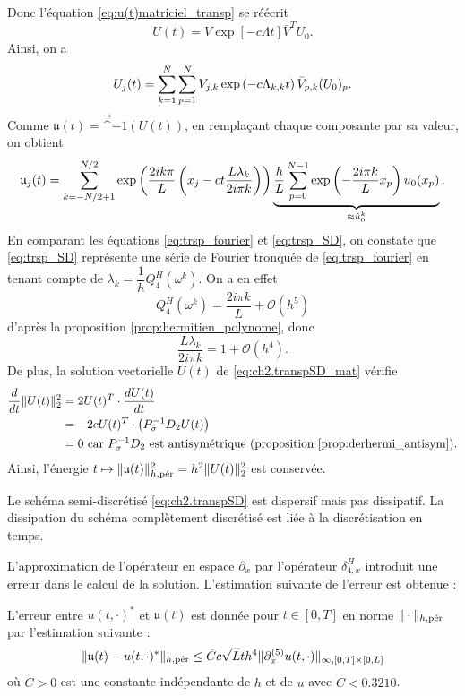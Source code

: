 Donc l'équation \eqref{eq:u(t)matriciel_transp} se réécrit
\begin{equation}
U(t) = V \exp \left[-c \Lambda t \right] \bar{V}^T U_0.
\end{equation}
Ainsi, on a
\begin{equation}
U_j(t) = \gsum_{k=1}^{N} \gsum_{p=1}^N V_{j,k} \exp \left( - c \Lambda_{k,k} t \right)  \bar{V}_{p,k}(U_0)_p.
\end{equation}
Comme $\mathfrak{u}(t) = \vec^{-1}(U(t))$, en remplaçant chaque composante par sa valeur, on obtient
\begin{equation}
\mathfrak{u}_j(t) = \gsum_{k=-N/2+1}^{N/2} \exp \left( \dfrac{2 i k \pi}{L} \left( x_j - ct \dfrac{L \lambda_k}{2 i \pi k} \right) \right) \underbrace{\dfrac{h}{L} \gsum_{p=0}^{N-1} \exp \left( - \dfrac{2 i \pi k}{L} x_p \right) u_0(x_p)}_{ \approx \hat{u}^k_0}.
\label{eq:trsp_SD}
\end{equation}
En comparant les équations \eqref{eq:trsp_fourier} et \eqref{eq:trsp_SD}, on constate que \eqref{eq:trsp_SD} représente une série de Fourier tronquée de \eqref{eq:trsp_fourier} en tenant compte de $\lambda_k = \dfrac{1}{h}Q_4^H(\omega^k)$. On a en effet
\begin{equation}
Q_4^H(\omega^k) = \dfrac{2 i \pi k}{L} + \mathcal{O} \left( h^5 \right)
\end{equation}
d'après la proposition \ref{prop:hermitien_polynome}, donc
\begin{equation}
\dfrac{L \lambda_k}{2 i \pi k} = 1 + \mathcal{O}(h^4).
\end{equation}
De plus, la solution vectorielle $U(t)$ de \eqref{eq:ch2.transpSD_mat} vérifie
\begin{align*}
\dfrac{d}{dt} \| U(t) \|_2^2 & = 2 U(t)^T \cdot \dfrac{d U(t)}{dt} \\
	& = - 2 c U(t)^T \cdot \left( P_{\sigma}^{-1}D_2 U(t) \right) \\
	& = 0 \text{ car } P_{\sigma}^{-1}D_2 \text{ est antisymétrique (proposition \ref{prop:derhermi_antisym})}.
\end{align*}
Ainsi, l'énergie $t \mapsto \| \mathfrak{u}(t) \|_{h,\per}^2 = h^2 \| U(t) \|_2^2$ est conservée.

Le schéma semi-discrétisé \eqref{eq:ch2.transpSD} est dispersif mais pas dissipatif. La dissipation du schéma complètement discrétisé est liée à la discrétisation en temps.

L'approximation de l'opérateur en espace $\partial_x$ par l'opérateur $\delta_{4,x}^H$ introduit une erreur dans le calcul de la solution. L'estimation suivante de l'erreur est obtenue :
\begin{proposition}
L'erreur entre $u(t,\cdot)^*$ et $\mathfrak{u}(t)$ est donnée pour $t \in [0,T]$ en norme $\| \cdot \|_{h,\per}$ par l'estimation suivante :
\begin{equation}
\| \mathfrak{u}(t) - u(t,\cdot)^* \|_{h,\per} \leq \tilde{C} c \sqrt{L} t h^4 \| \partial_x^{(5)} u(t,\cdot) \|_{\infty,[0,T] \times [0,L]}
\end{equation}
où $\tilde{C}>0$ est une constante indépendante de $h$ et de $u$ avec  $\tilde{C} < 0.3210$.
\label{prop:consistance_h_trsp}
\end{proposition}

